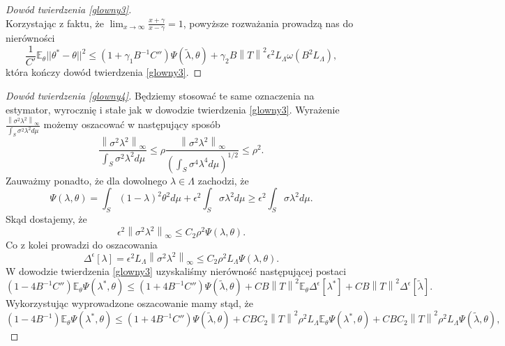 \documentclass{mwart}
\newcommand{\norm}[1]{\left\lVert#1\right\rVert}
\begin{document}
\begin{proof}[Dowód twierdzenia \ref{glowny3}]
\begin{displaymath}
\end{displaymath}
Korzystając z faktu, że $\lim_{x\to \infty}\frac{x+\gamma}{x-\gamma}=1$, powyższe rozważania prowadzą nas do nierówności  
\begin{displaymath}
\frac{1}{C'}\mathbb{E}_{\theta}||\theta^*-\theta||^2\leq (1+\gamma_1B^{-1}C'')\Psi(\tilde{\lambda},\theta)+\gamma_2B\norm{T}^2\epsilon^2L_{\Lambda}\omega (B^2L_{\Lambda}),
\end{displaymath}
która kończy dowód twierdzenia \ref{glowny3}.
\end{proof}

\begin{proof}[Dowód twierdzenia \ref{glowny4}] 
Będziemy stosować te same oznaczenia na estymator, wyrocznię i stałe jak w dowodzie twierdzenia \ref{glowny3}. 
Wyrażenie $\frac{\norm{\sigma^2\lambda^2}_{\infty}}{\int_S\sigma^2\lambda^2 d\mu}$ możemy oszacować w następujący sposób
\begin{displaymath}
\frac{\norm{\sigma^2\lambda^2}_{\infty}}{\int_S\sigma^2\lambda^2 d\mu}\leq \rho \frac{\norm{\sigma^2\lambda^2}_{\infty}}{\left(\int_S\sigma^4\lambda^4 d\mu\right)^{1/2}}\leq \rho^2.
\end{displaymath}
Zauważmy ponadto, że dla dowolnego $\lambda\in \Lambda$ zachodzi, że
\begin{displaymath}
\Psi(\lambda,\theta)=\int_S(1-\lambda)^2\theta ^2 d\mu+\epsilon^2\int_S\sigma\lambda^2 d\mu\geq \epsilon^2\int_S\sigma\lambda^2 d\mu.
\end{displaymath}
Skąd dostajemy, że
\begin{displaymath}
\epsilon^2\norm{\sigma^2\lambda^2}_{\infty}\leq C_2 \rho^2\Psi(\lambda,\theta).
\end{displaymath}
Co z kolei prowadzi do oszacowania
\begin{displaymath}
\Delta^{\epsilon}[\lambda]=\epsilon^2L_{\Lambda}\norm{\sigma^2\lambda^2}_{\infty}\leq C_2\rho^2L_{\Lambda}\Psi(\lambda,\theta).
\end{displaymath}
W dowodzie twierdzenia \ref{glowny3} uzyskaliśmy nierówność następującej postaci
\begin{displaymath}
(1-4B^{-1}C'')\mathbb{E}_{\theta}\Psi(\lambda^*,\theta)\leq (1+4B^{-1}C'')\Psi(\tilde{\lambda},\theta)+CB\norm{T}^2\mathbb{E}_{\theta}\Delta^{\epsilon}[\lambda^*]+CB\norm{T}^2\Delta^{\epsilon}[\tilde{\lambda}].
\end{displaymath}
Wykorzystując wyprowadzone oszacowanie mamy stąd, że
\begin{displaymath}
(1-4B^{-1})\mathbb{E}_{\theta}\Psi(\lambda^*,\theta)\leq (1+4B^{-1}C'')\Psi(\tilde{\lambda},\theta)+CBC_2\norm{T}^2\rho^2L_{\Lambda}\mathbb{E}_{\theta}\Psi(\lambda^*,\theta)+CBC_2\norm{T}^2\rho^2L_{\Lambda}\Psi(\tilde{\lambda},\theta),

\end{displaymath}
\end{proof}
\end{document}
